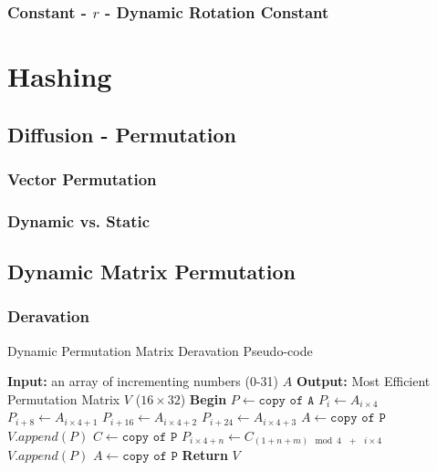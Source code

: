 \documentclass[fleqn, a4paper,12pt]{article}
\begin{document}
\subsubsection{Constant - $r$ - Dynamic Rotation Constant} %

\section{Hashing}



\subsection{Diffusion - Permutation}


\subsubsection{Vector Permutation}


\subsubsection{Dynamic vs. Static}

\subsection{Dynamic Matrix Permutation}



\subsubsection{Deravation}

\begin{algorithm}
\caption{Dynamic Permutation Matrix Deravation Pseudo-code}
\begin{algorithmic}[1]  %
\State \textbf{Input:} an array of incrementing numbers (0-31) $A$ 
\State \textbf{Output:} Most Efficient Permutation Matrix $V$ ($16 \times 32$)
\State \textbf{Begin}
\State $P \gets \texttt{copy of A}$
		\State $P_i      \gets A_{i \times 4}$
		\State $P_{i+8}  \gets A_{i \times 4 + 1}$
		\State $P_{i+16} \gets A_{i \times 4 + 2}$
		\State $P_{i+24} \gets A_{i \times 4 + 3}$
	\EndFor
	\State $A \gets \texttt{copy of P}$
	\State $V.append(P)$
	\State $C \gets \texttt{copy of P}$
			\State $P_{i \times 4 + n} \gets C_{(1+n+m) \mod{4} \texttt{    } + \texttt{    } i \times 4}$
			\EndFor
		\EndFor
		\State $V.append(P)$
	\EndFor
	\State $A \gets \texttt{copy of P}$
\EndFor
\State \textbf{Return} $V$
\end{algorithmic}
\end{algorithm}
\end{document}
